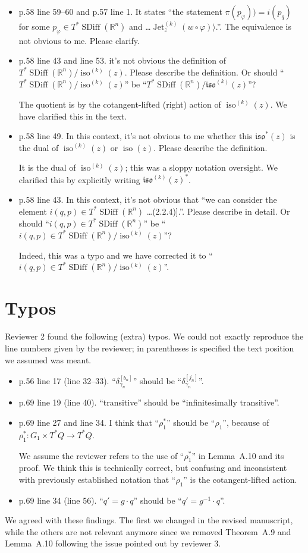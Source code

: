 \documentclass{article}
\def\R{\mathbb{R} }
\def\R{\mathbb{R} }
\DeclareMathOperator{\SDiff}{SDiff}
\DeclareMathOperator{\Jet}{Jet}
\DeclareMathOperator{\iso}{iso}
\begin{document}
\begin{itemize}
\item p.58 line 59--60 and p.57 line 1. It states ``the statement
  $\pi(p_\varphi)) = i(p_q)$ for some $p_\varphi \in T^*\SDiff(\R^n)$
  and \ldots $\Jet_z^{(k)}(w \circ \varphi)\rangle$.''.
  The equivalence is not obvious to me. Please clarify.

\item p.58 line 43 and line 53. it's not obvious the definition of
  $T^*\SDiff(\R^n)/\iso^{(k)}(z)$.
  Please describe the definition. Or should
  ``$T^*\SDiff(\R^n)/\iso^{(k)}(z)$''
  be ``$T^*\SDiff(\R^n)/\mathfrak{iso}^{(k)}(z)$''?

  The quotient is by the cotangent-lifted (right) action of
  $\iso^{(k)}(z)$. We have clarified this in the text.

\item p.58 line 49. In this context, it's not obvious to me whether
  this $\mathfrak{iso}^*(z)$ is the dual of $\iso^{(k)}(z)$ or
  $\iso(z)$. Please describe the definition.

  It is the dual of $\iso^{(k)}(z)$; this was a sloppy
  notation oversight. We clarified this by explicitly writing
  $\mathfrak{iso}^{(k)}(z)^*$.

\item p.58 line 43. In this context, it's not obvious that ``we can
  consider the element $i(q, p) \in T^*\SDiff(\R^n)$ \ldots (2.2.4)].''.
  Please describe in detail. Or should ``$i(q,p) \in T^*\SDiff(\R^n)$''
  be ``$i(q,p) \in T^*\SDiff(\R^n) / \iso^{(k)}(z)$''?

  Indeed, this was a typo and we have corrected it to
  ``$i(q,p) \in T^*\SDiff(\R^n) / \iso^{(k)}(z)$''.
\end{itemize}

\section{Typos}
Reviewer 2 found the following (extra) typos. We could not exactly
reproduce the line numbers given by the reviewer; in parentheses is
specified the text position we assumed was meant.
\begin{itemize}
\item p.56 line 17 (line 32--33). ``$\delta_{\gamma_n}^{[b_n]}$'' should be ``$\delta_{\gamma_n}^{[j_n]}$''.
\item p.69 line 19 (line 40). ``transitive'' should be ``infinitesimally transitive''.
\item p.69 line 27 and line 34. I think that ``$\rho_1^*$'' should be
  ``$\rho_1$'', because of $\rho_1^*: G_1 \times T^*Q \to T^*Q$.

  We assume the reviewer refers to the use of ``$\rho_1^*$'' in
  Lemma~A.10 and its proof. We think this is technically correct, but
  confusing and inconsistent with previously established notation that
  ``$\rho_1$'' is the cotangent-lifted action.
\item p.69 line 34 (line 56). ``$q' = g \cdot q$'' should be ``$q' = g^{-1} \cdot q$''.
\end{itemize}

\noindent
We agreed with these findings. The first we changed in the revised
manuscript, while the others are not relevant anymore since we removed
Theorem~A.9 and Lemma~A.10 following the issue pointed out by reviewer 3.
\end{document}

